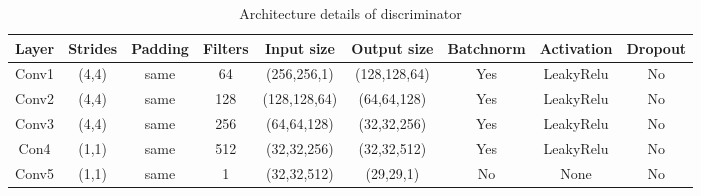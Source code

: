 \documentclass[a4paper,fleqn]{cas-dc}
\begin{document}
\begin{table}[htbp]
\caption{Architecture details of discriminator}
\begin{tabular}{|c|c|c|c|c|c|c|c|c|}
\hline
{\color[HTML]{000000} \textbf{Layer}} &
  {\color[HTML]{000000} \textbf{Strides}} &
  {\color[HTML]{000000} \textbf{Padding}} &
  {\color[HTML]{000000} \textbf{Filters}} &
  {\color[HTML]{000000} \textbf{Input size}} &
  {\color[HTML]{000000} \textbf{Output size}} &
  {\color[HTML]{000000} \textbf{Batchnorm}} &
  {\color[HTML]{000000} \textbf{Activation}} &
  {\color[HTML]{000000} \textbf{Dropout}} \\ \hline
{\color[HTML]{000000} Conv1} &
  {\color[HTML]{000000} (4,4)} &
  {\color[HTML]{000000} same} &
  {\color[HTML]{000000} 64} &
  {\color[HTML]{000000} (256,256,1)} &
  {\color[HTML]{000000} (128,128,64)} &
  {\color[HTML]{000000} Yes} &
  {\color[HTML]{000000} LeakyRelu} &
  {\color[HTML]{000000} No} \\ \hline
{\color[HTML]{000000} Conv2} &
  {\color[HTML]{000000} (4,4)} &
  {\color[HTML]{000000} same} &
  {\color[HTML]{000000} 128} &
  {\color[HTML]{000000} (128,128,64)} &
  {\color[HTML]{000000} (64,64,128)} &
  {\color[HTML]{000000} Yes} &
  {\color[HTML]{000000} LeakyRelu} &
  {\color[HTML]{000000} No} \\ \hline
{\color[HTML]{000000} Conv3} &
  {\color[HTML]{000000} (4,4)} &
  {\color[HTML]{000000} same} &
  {\color[HTML]{000000} 256} &
  {\color[HTML]{000000} (64,64,128)} &
  {\color[HTML]{000000} (32,32,256)} &
  {\color[HTML]{000000} Yes} &
  {\color[HTML]{000000} LeakyRelu} &
  {\color[HTML]{000000} No} \\ \hline
{\color[HTML]{000000} Con4} &
  {\color[HTML]{000000} (1,1)} &
  {\color[HTML]{000000} same} &
  {\color[HTML]{000000} 512} &
  {\color[HTML]{000000} (32,32,256)} &
  {\color[HTML]{000000} (32,32,512)} &
  {\color[HTML]{000000} Yes} &
  {\color[HTML]{000000} LeakyRelu} &
  {\color[HTML]{000000} No} \\ \hline
{\color[HTML]{000000} Conv5} &
  {\color[HTML]{000000} (1,1)} &
  {\color[HTML]{000000} same} &
  {\color[HTML]{000000} 1} &
  {\color[HTML]{000000} (32,32,512)} &
  {\color[HTML]{000000} (29,29,1)} &
  {\color[HTML]{000000} No} &
  {\color[HTML]{000000} None} &
  {\color[HTML]{000000} No} \\ \hline
\end{tabular}
\label{tab2}
\end{table}

\printcredits
\end{document}
